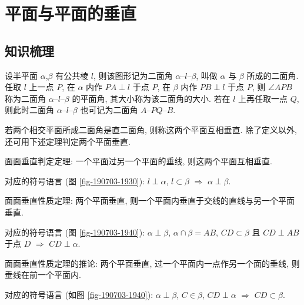 
\section{平面与平面的垂直}

\subsection{知识梳理}

设半平面 $\alpha$,$\beta$ 有公共棱 $l$, 则该图形记为二面角 $\alpha\text{--}l\text{--}\beta$, 叫做 $\alpha$ 与 $\beta$ 所成的二面角. 任取 $l$ 上一点 $P$, 在 $\alpha$ 内作 $PA\perp l$ 于点 $P$, 在 $\beta$ 内作 $PB\perp l$ 于点 $P$, 则 $\angle APB$ 称为二面角 $\alpha\text{--}l\text{--}\beta$ 的平面角, 其大小称为该二面角的大小. 若在 $l$ 上再任取一点 $Q$, 则此时二面角 $\alpha\text{--}l\text{--}\beta$ 也可记为二面角 $A\text{--}PQ\text{--}B$.

若两个相交平面所成二面角是直二面角, 则称这两个平面互相垂直. 除了定义以外, 还可用下述定理判定两个平面垂直.

面面垂直判定定理: 一个平面过另一个平面的垂线, 则这两个平面互相垂直.

对应的符号语言 (图 \ref{fig-190703-1930}): $l\perp\alpha$, $l\subset\beta$ $\Rightarrow$ $\alpha\perp\beta$.

面面垂直性质定理: 两个平面垂直, 则一个平面内垂直于交线的直线与另一个平面垂直.

对应的符号语言 (图 \ref{fig-190703-1940}): $\alpha\perp\beta$, $\alpha\cap\beta= AB$, $CD\subset\beta$ 且 $CD\perp AB$ 于点 $D$ $\Rightarrow$ $CD\perp\alpha$.

面面垂直性质定理的推论: 两个平面垂直, 过一个平面内一点作另一个面的垂线, 则垂线在前一个平面内.

对应的符号语言 (如图 \ref{fig-190703-1940}): $\alpha\perp\beta$, $C\in\beta$, $CD\perp\alpha$ $\Rightarrow$ $CD\subset\beta$.
 
